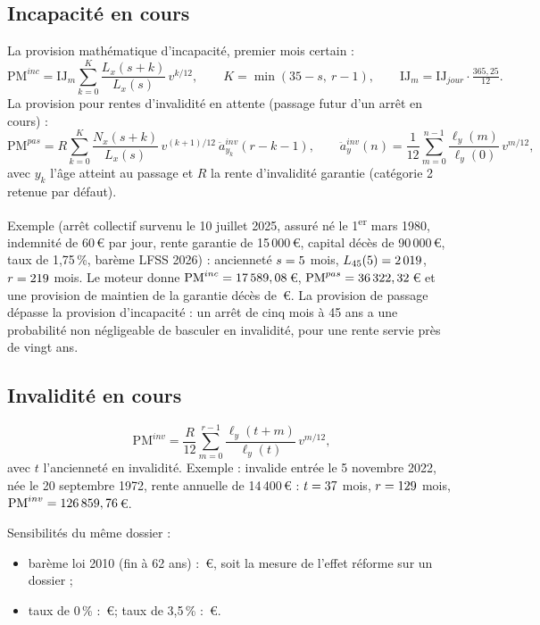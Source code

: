 \documentclass[11pt,a4paper]{article}
\newcommand{\eur}{\,€}
\begin{document}
\subsection{Incapacité en cours}
La provision mathématique d'incapacité, premier mois certain :
\[
\mathrm{PM}^{inc} = \mathrm{IJ}_m \sum_{k=0}^{K} \frac{L_x(s+k)}{L_x(s)}\, v^{k/12}, \qquad K = \min(35 - s,\ r - 1), \qquad \mathrm{IJ}_m = \mathrm{IJ}_{jour} \cdot \tfrac{365{,}25}{12}.
\]
La provision pour rentes d'invalidité en attente (passage futur d'un arrêt en cours) :
\[
\mathrm{PM}^{pas} = R \sum_{k=0}^{K} \frac{N_x(s+k)}{L_x(s)}\, v^{(k+1)/12}\ \ddot a^{inv}_{y_k}(r - k - 1),
\qquad \ddot a^{inv}_{y}(n) = \frac{1}{12}\sum_{m=0}^{n-1} \frac{\ell_y(m)}{\ell_y(0)}\, v^{m/12},
\]
avec $y_k$ l'âge atteint au passage et $R$ la rente d'invalidité garantie (catégorie 2 retenue par défaut).

Exemple (arrêt collectif survenu le 10 juillet 2025, assuré né le 1\textsuperscript{er} mars 1980, indemnité de 60\eur{} par jour, rente garantie de 15\,000\eur, capital décès de 90\,000\eur, taux de 1,75\,\%, barème LFSS 2026) : ancienneté $s = 5$ mois, $L_{45}(5) = 2\,019$, $r = 219$ mois. Le moteur donne $\mathrm{PM}^{inc} = 17\,589,08$\eur, $\mathrm{PM}^{pas} = 36\,322,32$\eur{} et une provision de maintien de la garantie décès de \exIncGd\eur. La provision de passage dépasse la provision d'incapacité : un arrêt de cinq mois à 45 ans a une probabilité non négligeable de basculer en invalidité, pour une rente servie près de vingt ans.

\subsection{Invalidité en cours}
\[
\mathrm{PM}^{inv} = \frac{R}{12} \sum_{m=0}^{r-1} \frac{\ell_y(t+m)}{\ell_y(t)}\, v^{m/12},
\]
avec $t$ l'ancienneté en invalidité. Exemple : invalide entrée le 5 novembre 2022, née le 20 septembre 1972, rente annuelle de 14\,400\eur{} : $t = 37$ mois, $r = 129$ mois, $\mathrm{PM}^{inv} = 126\,859,76$\eur.

Sensibilités du même dossier :
\begin{itemize}
\item barème loi 2010 (fin à 62 ans) : \exInvPmLOIA\eur, soit la mesure de l'effet réforme sur un dossier ;
\item taux de 0\,\% : \exInvPmTauxZero\eur ; taux de 3,5\,\% : \exInvPmTauxHaut\eur.
\end{itemize}
\end{document}
